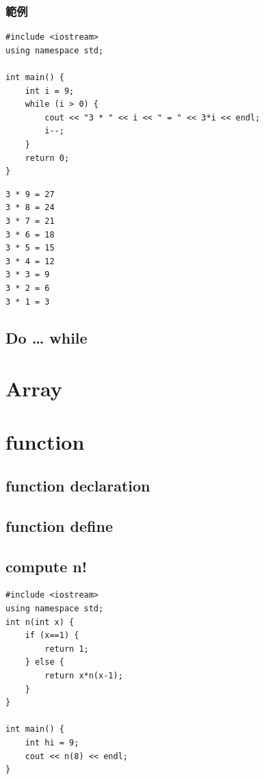 \documentclass[12pt,a4paper]{article}
\begin{document}
\subsubsection{範例}
\label{sec:orgf5da40f}
\lstset{breaklines=true,language=cpp,label= ,caption= ,captionpos=b,firstnumber=1,numbers=left}
\begin{lstlisting}
#include <iostream>
using namespace std;

int main() {
    int i = 9;
    while (i > 0) {
        cout << "3 * " << i << " = " << 3*i << endl;
        i--;
    }
    return 0;
}
\end{lstlisting}

\begin{verbatim}
3 * 9 = 27
3 * 8 = 24
3 * 7 = 21
3 * 6 = 18
3 * 5 = 15
3 * 4 = 12
3 * 3 = 9
3 * 2 = 6
3 * 1 = 3
\end{verbatim}

\subsection{Do \ldots{} while}
\label{sec:org3686525}

\section{Array}
\label{cpp_arrays}

\section{function}
\label{cpp_functions}
\subsection{function declaration}
\label{sec:orgfcf33d5}

\subsection{function define}
\label{sec:orgf578774}

\subsection{compute n!}
\label{sec:org8e08856}
\lstset{breaklines=true,language=C++,label= ,caption= ,captionpos=b,numbers=none}
\begin{lstlisting}
#include <iostream>
using namespace std;
int n(int x) {
    if (x==1) {
        return 1;
    } else {
        return x*n(x-1);
    }
}

int main() {
    int hi = 9;
    cout << n(8) << endl;
}

\end{lstlisting}
\end{document}
